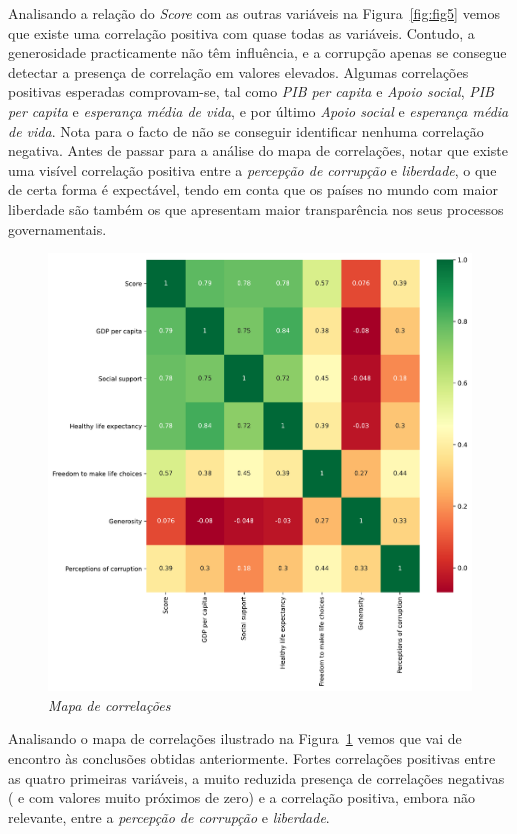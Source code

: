 \documentclass[12pt, a4paper]{article}
\begin{document}
Analisando a relação do \emph{Score} com as outras variáveis na Figura~\ref{fig:fig5} vemos que existe uma correlação positiva com quase todas as variáveis. Contudo, a generosidade
practicamente não têm influência, e a corrupção apenas se consegue
detectar a presença de correlação em valores elevados. Algumas correlações positivas
esperadas comprovam-se, tal como \emph{PIB per capita} e \emph{Apoio
social}, \emph{PIB per capita} e \emph{esperança média de vida}, e por
último \emph{Apoio social} e \emph{esperança média de vida}. Nota para o
facto de não se conseguir identificar nenhuma correlação
negativa. Antes de passar para a análise do
mapa de correlações, notar que existe uma visível correlação positiva
entre a \emph{percepção de corrupção} e \emph{liberdade}, o que de certa
forma é expectável, tendo em conta que os países no mundo com maior
liberdade são também os que apresentam maior transparência nos seus
processos governamentais.

\begin{figure}[h]
\includegraphics[scale=0.60]{corrmap.pdf}
\centering
\caption{\emph{Mapa de correlações}}
\label{fig:fig6}
\end{figure}

Analisando o mapa de correlações ilustrado na Figura~\ref{fig:fig6} vemos que vai de encontro às conclusões
obtidas anteriormente. Fortes correlações positivas entre as quatro
primeiras variáveis, a muito reduzida presença de correlações negativas
( e com valores muito próximos de zero) e a correlação positiva, embora
não relevante, entre a \emph{percepção de corrupção} e \emph{liberdade}.
\end{document}
